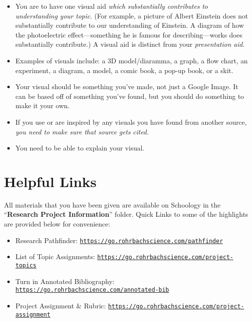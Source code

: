 \documentclass[10pt]{exam}
\begin{document}
\begin{itemize}
  \item 
    You are to have one visual aid \emph{which substantially contributes to understanding your topic}. (For example, a picture of Albert Einstein does not substantially contribute to our understanding of Einstein.  A diagram of how the photoelectric effect---something he is famous for describing---works does substantially contribute.)  A visual aid is distinct from your \emph{presentation aid}.
  
  \item 
    Examples of visuals include: a 3D model/diaramma, a graph, a flow chart, an experiment, a	diagram, a model, a comic book, a pop-up book, or a skit.

  \item
    Your visual should be something you've made, not just a Google Image.  It can be based off of something you've found, but you should do something to make it your own.

  \item  
    If you use or are inspired by any visuals you have found from another source, \emph{you need to make sure that source gets cited.}

  \item
    You need to be able to explain your visual.
  
\end{itemize}


\section*{Helpful Links}

All materials that you have been given are available on Schoology in the ``{\bf Research Project Information}'' folder.  Quick Links to some of the highlights are provided below for convenience:

\begin{itemize}
  \item 
    Research Pathfinder: \texttt{\href{https://go.rohrbachscience.com/pathfinder}{https://go.rohrbachscience.com/pathfinder}}
  \item 
    List of Topic Assignments: \texttt{\href{https://go.rohrbachscience.com/project-topics}{https://go.rohrbachscience.com/project-topics}}
  \item 
    Turn in Annotated Bibliography: \texttt{\href{https://go.rohrbachscience.com/annotated-bib}{https://go.rohrbachscience.com/annotated-bib}}
  \item 
    Project Assignment \& Rubric: \texttt{\href{https://go.rohrbachscience.com/project-assignment}{https://go.rohrbachscience.com/project-assignment}}
\end{itemize}
\end{document}
